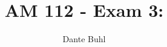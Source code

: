 \documentclass{article}
\begin{document}
\title{AM 112 - Exam 3:}
\author{Dante Buhl}


\newcommand{\wrms}{w_{\text{rms}}}
\newcommand{\bs}[1]{\boldsymbol{#1}}
\newcommand{\tb}[1]{\textbf{#1}}
\newcommand{\bmp}[1]{\begin{minipage}{#1\textwidth}}
\newcommand{\emp}{\end{minipage}}
\newcommand{\R}{\mathbb{R}}
\newcommand{\C}{\mathbb{C}}
\newcommand{\N}{\mathcal{N}}
\newcommand{\K}{\bs{\mathrm{K}}}
\newcommand{\m}{\bs{\mu}_*}
\newcommand{\s}{\bs{\Sigma}_*}
\newcommand{\dt}{\Delta t}
\newcommand{\dx}{\Delta x}
\newcommand{\tr}[1]{\text{Tr}(#1)}
\newcommand{\Tr}[1]{\text{Tr}(#1)}
\newcommand{\Div}{\nabla \cdot}
\renewcommand{\div}{\nabla \cdot}
\newcommand{\Curl}{\nabla \times}
\newcommand{\Grad}{\nabla}
\newcommand{\grad}{\nabla}
\newcommand{\grads}{\nabla_s}
\newcommand{\gradf}{\nabla_f}
\newcommand{\xs}{x_s}
\newcommand{\xf}{x_f}
\newcommand{\ts}{t_s}
\newcommand{\tf}{t_f}
\newcommand{\pt}{\partial t}
\newcommand{\pz}{\partial z}
\newcommand{\uvec}{\bs{u}}
\newcommand{\bvec}{\bs{B}}
\newcommand{\B}{\bs{B}}
\newcommand{\jvec}{\bs{j}}
\newcommand{\F}{\bs{F}}
\newcommand{\T}{\tilde{T}}
\newcommand{\ez}{\bs{e}_z}
\newcommand{\ex}{\bs{e}_x}
\newcommand{\ey}{\bs{e}_y}
\newcommand{\eo}{\bs{e}_{\bs{\Omega}}}
\newcommand{\ppt}[1]{\frac{\partial #1}{\partial t}}
\newcommand{\pp}[2]{\frac{\partial #1}{\partial #2}}
\newcommand{\pptwo}[2]{\frac{\partial^2 #1}{\partial #2^2}}
\newcommand{\DDt}[1]{\frac{D #1}{D t}}
\newcommand{\ppts}[1]{\frac{\partial #1}{\partial t_s}}
\newcommand{\pptf}[1]{\frac{\partial #1}{\partial t_f}}
\newcommand{\ppz}[1]{\frac{\partial #1}{\partial z}}
\newcommand{\ddz}[1]{\frac{d #1}{d z}}
\newcommand{\ppzetas}[1]{\frac{\partial^2 #1}{\partial \zeta^2}}
\newcommand{\ppzs}[1]{\frac{\partial #1}{\partial z_s}}
\newcommand{\ppzf}[1]{\frac{\partial #1}{\partial z_f}}
\newcommand{\ppx}[1]{\frac{\partial #1}{\partial x}}
\newcommand{\ppxi}[1]{\frac{\partial #1}{\partial x_i}}
\newcommand{\ppxj}[1]{\frac{\partial #1}{\partial x_j}}
\newcommand{\ppy}[1]{\frac{\partial #1}{\partial y}}
\newcommand{\ppzeta}[1]{\frac{\partial #1}{\partial \zeta}}


\maketitle 
\setlength{\parindent}{0pt}
\setcounter{section}{3}
\section{}
\end{document}
